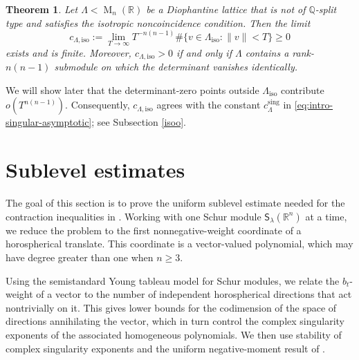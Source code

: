 \documentclass[reqno,11pt]{amsart}
\numberwithin{equation}{section}
\newtheorem{theorem}{Theorem}[section]
\theoremstyle{definition}
\theoremstyle{remark}
\newcommand{\op}{\operatorname}
\newcommand{\M}{\op{M}}
\begin{document}
\begin{theorem}\label{thm:quasinullcontribution2}
Let $\Lambda<\M_n(\mathbb R)$ be a Diophantine lattice that is not of
$\mathbb Q$-split type and satisfies the
isotropic noncoincidence condition. Then the limit
$$
c_{\Lambda,\mathrm{iso}}
:=
\lim_{T\to\infty}
T^{-n(n-1)}
\#\{v\in\Lambda_{\operatorname{iso}}:\|v\|< T\}\geq 0
$$
exists and is finite. Moreover, $c_{\Lambda,\mathrm{iso}}>0$ if and
only if $\Lambda$ contains a rank-$n(n-1)$ submodule on which the
determinant vanishes identically.
\end{theorem}
We will show later that the determinant-zero points outside $\Lambda_{\operatorname{iso}}$ contribute $o(T^{n(n-1)})$. Consequently,
$c_{\Lambda,\mathrm{iso}}$  agrees with the constant
$c_\Lambda^{\operatorname{sing}}$ in
\eqref{eq:intro-singular-asymptotic}; see Subsection \ref{isoo}.


\section{Sublevel estimates}
\label{s:sublevel-general-n}
The goal of this section is to prove the uniform sublevel estimate needed for
the contraction inequalities in
. Working with one Schur module
${\mathsf S}_\lambda(\mathbb R^n)$ at a time, we reduce the problem to the
first nonnegative-weight coordinate of a horospherical translate. This
coordinate is a vector-valued polynomial, which may have degree greater
than one when $n\ge3$.

Using the semistandard Young tableau model for Schur modules, we relate the
$b_t$-weight of a vector to the number of independent horospherical
directions that act nontrivially on it.  This gives lower bounds for the
codimension of the space of directions annihilating the vector, which in
turn control the complex singularity exponents of the associated homogeneous
polynomials.  We then use stability of complex singularity exponents and the
uniform negative-moment result of .
\end{document}
